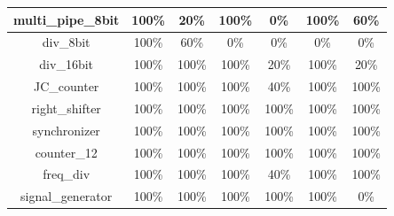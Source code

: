 \begin{tabular}{c|cc|cc|cc}
multi\_pipe\_8bit & \color{black} {\cellcolor{lightblue}} 100\% & 20\% & \color{black} {\cellcolor{lightblue}} 100\% & 0\% & \color{black} {\cellcolor{lightblue}} 100\% & \color{black} {\cellcolor{lightgreen}} 60\% \\ \midrule
div\_8bit & \color{black} {\cellcolor{lightblue}} 100\% & \color{black} {\cellcolor{lightgreen}} 60\% & 0\% & 0\% & 0\% & 0\% \\ \midrule
div\_16bit & \color{black} {\cellcolor{lightblue}} 100\% & \color{black} {\cellcolor{lightgreen}} 100\% & \color{black} {\cellcolor{lightblue}} 100\% & 20\% & \color{black} {\cellcolor{lightblue}} 100\% & 20\% \\ \midrule
JC\_counter & \color{black} {\cellcolor{lightblue}} 100\% & \color{black} {\cellcolor{lightgreen}} 100\% & \color{black} {\cellcolor{lightblue}} 100\% & 40\% & \color{black} {\cellcolor{lightblue}} 100\% & \color{black} {\cellcolor{lightgreen}} 100\% \\ \midrule
right\_shifter & \color{black} {\cellcolor{lightblue}} 100\% & \color{black} {\cellcolor{lightgreen}} 100\% & \color{black} {\cellcolor{lightblue}} 100\% & \color{black} {\cellcolor{lightgreen}} 100\% & \color{black} {\cellcolor{lightblue}} 100\% & \color{black} {\cellcolor{lightgreen}} 100\% \\ \midrule
synchronizer & \color{black} {\cellcolor{lightblue}} 100\% & \color{black} {\cellcolor{lightgreen}} 100\% & \color{black} {\cellcolor{lightblue}} 100\% & \color{black} {\cellcolor{lightgreen}} 100\% & \color{black} {\cellcolor{lightblue}} 100\% & \color{black} {\cellcolor{lightgreen}} 100\% \\ \midrule
counter\_12 & \color{black} {\cellcolor{lightblue}} 100\% & \color{black} {\cellcolor{lightgreen}} 100\% & \color{black} {\cellcolor{lightblue}} 100\% & \color{black} {\cellcolor{lightgreen}} 100\% & \color{black} {\cellcolor{lightblue}} 100\% & \color{black} {\cellcolor{lightgreen}} 100\% \\ \midrule
freq\_div & \color{black} {\cellcolor{lightblue}} 100\% & \color{black} {\cellcolor{lightgreen}} 100\% & \color{black} {\cellcolor{lightblue}} 100\% & 40\% & \color{black} {\cellcolor{lightblue}} 100\% & \color{black} {\cellcolor{lightgreen}} 100\% \\ \midrule
signal\_generator & \color{black} {\cellcolor{lightblue}} 100\% & \color{black} {\cellcolor{lightgreen}} 100\% & \color{black} {\cellcolor{lightblue}} 100\% & \color{black} {\cellcolor{lightgreen}} 100\% & \color{black} {\cellcolor{lightblue}} 100\% & 0\% \\ \midrule

\end{tabular}
